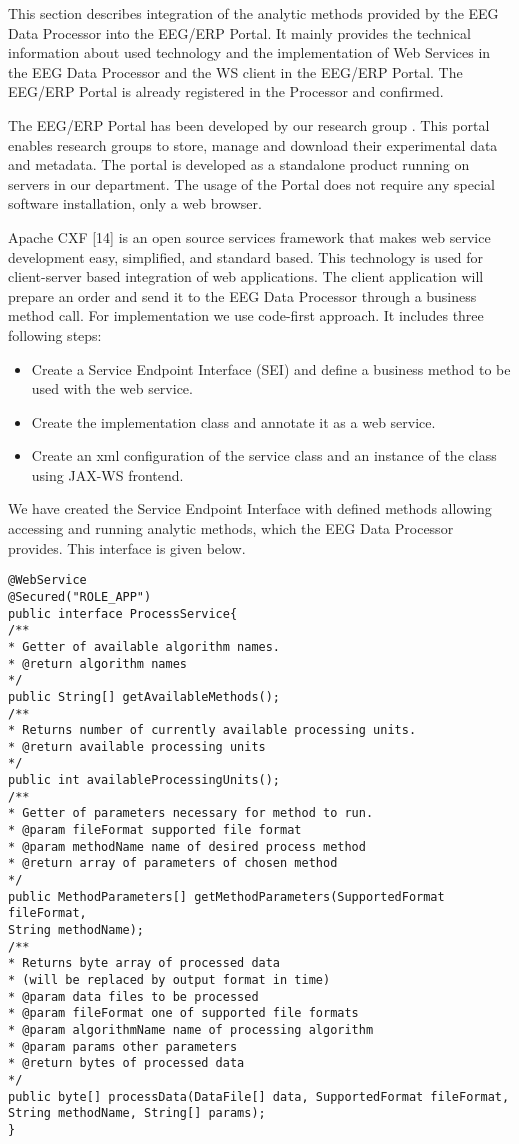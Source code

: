 \documentclass{frontiersSCNS} %
\begin{document}
This section describes integration of the analytic methods provided by the EEG Data Processor into the EEG/ERP Portal. It mainly provides the technical information about used technology and the implementation of Web Services in the EEG Data Processor and the WS client in the EEG/ERP Portal. The EEG/ERP Portal is already registered in the Processor and confirmed.

The EEG/ERP Portal has been developed by our research group \cite{Jezek10}. This portal enables research groups to store, manage and download their experimental data and metadata. The portal is developed as a standalone product running on servers in our department. The usage of the Portal does not require any special software installation, only a web browser.

Apache CXF [14] is an open source services framework that makes web service development easy, simplified, and standard based. This technology is used for client-server based integration of web applications. The client application will prepare an order and send it to the EEG Data Processor through a business method call. For implementation we use code-first approach. It includes three following steps:

\begin{itemize}
\item Create a Service Endpoint Interface (SEI) and define a business method to be used with the web service.
\item Create the implementation class and annotate it as a web service.
\item Create an xml configuration of the service class and an instance of the class using JAX-WS frontend.

\end{itemize}

We have created the Service Endpoint Interface with defined methods allowing accessing and running analytic methods, which the EEG Data Processor provides. This interface is given below.

\begin{small}
\begin{verbatim}
@WebService
@Secured("ROLE_APP")
public interface ProcessService{
/**
* Getter of available algorithm names.
* @return algorithm names
*/
public String[] getAvailableMethods();
/**
* Returns number of currently available processing units.
* @return available processing units
*/
public int availableProcessingUnits();
/**
* Getter of parameters necessary for method to run.
* @param fileFormat supported file format
* @param methodName name of desired process method
* @return array of parameters of chosen method
*/
public MethodParameters[] getMethodParameters(SupportedFormat fileFormat, 
String methodName);
/**
* Returns byte array of processed data
* (will be replaced by output format in time)
* @param data files to be processed
* @param fileFormat one of supported file formats
* @param algorithmName name of processing algorithm
* @param params other parameters
* @return bytes of processed data
*/
public byte[] processData(DataFile[] data, SupportedFormat fileFormat, 
String methodName, String[] params);
}
\end{verbatim}
\end{small}
\end{document}
